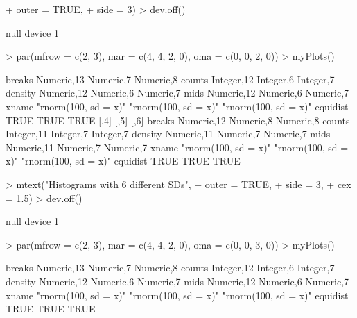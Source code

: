\documentclass[12pt,letterpaper,final]{article}
\begin{document}
\begin{Schunk}
\begin{Sinput}
+       outer = TRUE,
+       side = 3)
> dev.off()
\end{Sinput}
\begin{Soutput}
null device 
          1 
\end{Soutput}
\begin{Sinput}
> par(mfrow = c(2, 3), mar = c(4, 4, 2, 0), oma = c(0, 0, 2, 0))
> myPlots()
\end{Sinput}
\begin{Soutput}
         [,1]                 [,2]                 [,3]                
breaks   Numeric,13           Numeric,7            Numeric,8           
counts   Integer,12           Integer,6            Integer,7           
density  Numeric,12           Numeric,6            Numeric,7           
mids     Numeric,12           Numeric,6            Numeric,7           
xname    "rnorm(100, sd = x)" "rnorm(100, sd = x)" "rnorm(100, sd = x)"
equidist TRUE                 TRUE                 TRUE                
         [,4]                 [,5]                 [,6]                
breaks   Numeric,12           Numeric,8            Numeric,8           
counts   Integer,11           Integer,7            Integer,7           
density  Numeric,11           Numeric,7            Numeric,7           
mids     Numeric,11           Numeric,7            Numeric,7           
xname    "rnorm(100, sd = x)" "rnorm(100, sd = x)" "rnorm(100, sd = x)"
equidist TRUE                 TRUE                 TRUE                
\end{Soutput}
\begin{Sinput}
> mtext("Histograms with 6 different SDs", 
+       outer = TRUE,
+       side = 3,
+       cex = 1.5)
> dev.off()
\end{Sinput}
\begin{Soutput}
null device 
          1 
\end{Soutput}
\begin{Sinput}
> par(mfrow = c(2, 3), mar = c(4, 4, 2, 0), oma = c(0, 0, 3, 0))
> myPlots()
\end{Sinput}
\begin{Soutput}
         [,1]                 [,2]                 [,3]                
breaks   Numeric,13           Numeric,7            Numeric,8           
counts   Integer,12           Integer,6            Integer,7           
density  Numeric,12           Numeric,6            Numeric,7           
mids     Numeric,12           Numeric,6            Numeric,7           
xname    "rnorm(100, sd = x)" "rnorm(100, sd = x)" "rnorm(100, sd = x)"
equidist TRUE                 TRUE                 TRUE                

\end{Soutput}
\end{Schunk}
\end{document}
